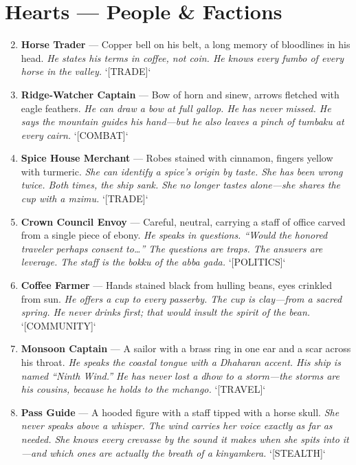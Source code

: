 \section*{Hearts --- People \& Factions}
\label{sec:taharka-people}
\begin{enumerate}
\setcounter{enumi}{1}
\item \textbf{Horse Trader} --- Copper bell on his belt, a long memory of bloodlines in his head.
  \hfill \textit{He states his terms in coffee, not coin. He knows every \textit{fumbo} of every horse in the valley.} `[TRADE]`
\item \textbf{Ridge-Watcher Captain} --- Bow of horn and sinew, arrows fletched with eagle feathers.
  \hfill \textit{He can draw a bow at full gallop. He has never missed. He says the mountain guides his hand---but he also leaves a pinch of \textit{tumbaku} at every cairn.} `[COMBAT]`
\item \textbf{Spice House Merchant} --- Robes stained with cinnamon, fingers yellow with turmeric.
  \hfill \textit{She can identify a spice's origin by taste. She has been wrong twice. Both times, the ship sank. She no longer tastes alone---she shares the cup with a \textit{mzimu}.} `[TRADE]`
\item \textbf{Crown Council Envoy} --- Careful, neutral, carrying a staff of office carved from a single piece of ebony.
  \hfill \textit{He speaks in questions. ``Would the honored traveler perhaps consent to\dots'' The questions are traps. The answers are leverage. The staff is the \textit{bokku} of the \textit{abba gada}.} `[POLITICS]`
\item \textbf{Coffee Farmer} --- Hands stained black from hulling beans, eyes crinkled from sun.
  \hfill \textit{He offers a cup to every passerby. The cup is clay---from a sacred spring. He never drinks first; that would insult the spirit of the bean.} `[COMMUNITY]`
\item \textbf{Monsoon Captain} --- A sailor with a brass ring in one ear and a scar across his throat.
  \hfill \textit{He speaks the coastal tongue with a Dhaharan accent. His ship is named ``Ninth Wind.'' He has never lost a dhow to a storm---the storms are his cousins, because he holds to the \textit{mchango}.} `[TRAVEL]`
\item \textbf{Pass Guide} --- A hooded figure with a staff tipped with a horse skull.
  \hfill \textit{She never speaks above a whisper. The wind carries her voice exactly as far as needed. She knows every crevasse by the sound it makes when she spits into it---and which ones are actually the breath of a \textit{kinyamkera}.} `[STEALTH]`

\end{enumerate}
